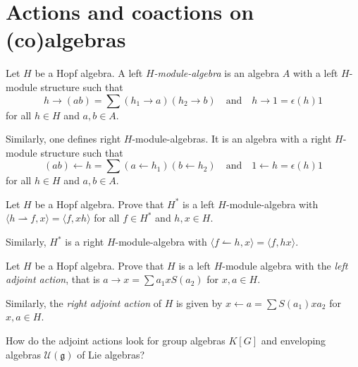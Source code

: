\section{Actions and coactions on (co)algebras}

\begin{definition}
\label{def:module_algebra}
Let $H$ be a Hopf algebra. A left \emph{$H$-module-algebra} is an algebra
$A$ with a left $H$-module structure such that
\[
h\rightarrow(ab)=\sum (h_{1}\rightarrow a)(h_{2}\rightarrow b)
\quad \text{and}\quad 
h\rightarrow1=\epsilon(h)1
\]
for all $h\in H$ and $a,b\in A$. 
\end{definition}

Similarly, one defines right $H$-module-algebras. It is an
algebra with a right $H$-module structure such that 
\[
(ab)\leftarrow
h=\sum (a\leftarrow h_{1})(b\leftarrow h_{2})
\quad\text{and}\quad 1\leftarrow h=\epsilon(h)1 
\]
for
all $h\in H$ and $a,b\in A$. 

\begin{exercise}
\label{xca:dualH_on_H}
Let $H$ be a Hopf algebra.  Prove that $H^*$ is a left $H$-module-algebra
with  $\langle h\rightharpoonup f,x\rangle=\langle f,xh\rangle$ for all $f\in
H^*$ and $h,x\in H$.  
\end{exercise}

Similarly, $H^*$ is a right $H$-module-algebra
with $\langle f\leftharpoonup h,x\rangle=\langle f,hx\rangle$.

\begin{exercise}
\label{xca:adjoint}
Let $H$ be a Hopf algebra. Prove that $H$ is a left $H$-module algebra with 
the \emph{left
adjoint action}, that is 
$a\rightarrow x=\sum a_{1}xS(a_{2})$
for $x,a\in H$.
\end{exercise}

Similarly, the \emph{right
adjoint action} of $H$ is given by 
$x\leftarrow a=\sum S(a_{1})xa_{2}$ for $x,a\in H$.  

\begin{exercise}
    How do the adjoint actions look for 
    group algebras $K[G]$ and enveloping algebras 
    $\mathcal{U}(\mathfrak{g})$ of Lie algebras? 
\end{exercise}


